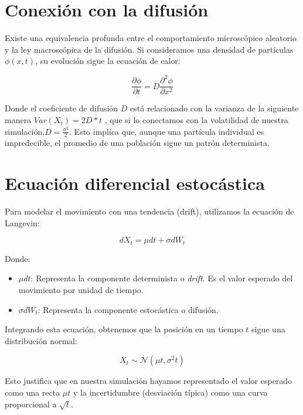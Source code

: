 \documentclass[11pt]{article}
\begin{document}
	\section{Conexión con la difusión}
		Existe una equivalencia profunda entre el comportamiento microscópico aleatorio y la ley macroscópica de la difusión. Si consideramos una densidad de partículas $\phi(x,t)$, su evolución sigue la ecuación de calor:
		
		\begin{equation}
			\frac{\partial \phi}{\partial t} = D \frac{\partial^2 \phi}{\partial x^2}
		\end{equation}
		
		Donde el coeficiente de difusión $D$ está relacionado con la varianza de la siguiente manera $Var(X_t) = 2D*t$ \hyperref[einstein1906theory]{\cite{einstein1906theory}}, que si lo conectamos con la volatilidad de nuestra simulación,$D = \frac{\sigma^2}{2}$. Esto implica que, aunque una partícula individual es impredecible, el promedio de una población sigue un patrón determinista.
		
	\section{Ecuación diferencial estocástica}
		Para modelar el movimiento con una tendencia (drift), utilizamos la ecuación de Langevin:
		
		\begin{equation}
			dX_t = \mu dt + \sigma dW_t
		\end{equation}
		
		Donde:
		
		\begin{itemize}
			\item $\mu dt$: Representa la componente determinista o \textit{drift}. Es el valor esperado del movimiento por unidad de tiempo.
			\item $\sigma dW_t$: Representa la componente estocástica o difusión.
		\end{itemize}
		
		Integrando esta ecuación, obtenemos que la posición en un tiempo $t$ sigue una distribución normal:
		
		\begin{equation}
			X_t \sim \mathcal{N}(\mu t, \sigma^2 t)
		\end{equation}
		
		Esto justifica que en nuestra simulación hayamos representado el valor esperado como una recta $\mu t$ y la incertidumbre (desviación típica) como una curva proporcional a $\sqrt{t}$.
		
\end{document}
